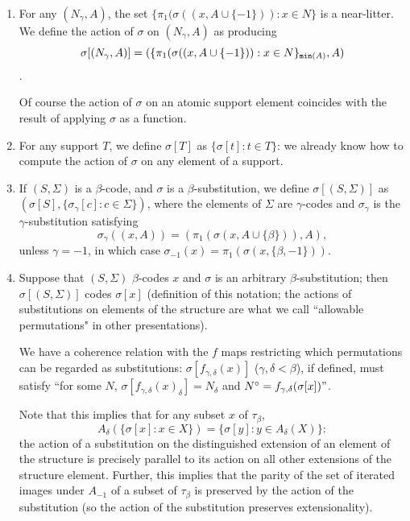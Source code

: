 \documentclass[12pt]{article}
\begin{document}
\begin{enumerate}
\begin{enumerate}
\item  For any $(N_\gamma,A)$, the set $\{\pi_1(\sigma((x,A\cup \{-1\})):x \in N\}$ is a near-litter.  We define the action of $\sigma$ on $(N_\gamma,A)$ as producing  $$\sigma[(N_\gamma,A)] = (\{\pi_1(\sigma((x,A\cup \{-1\})):x \in N\}_{{\tt min}(A)},A)$$.

Of course the action of $\sigma$ on an atomic support element coincides with the result of applying $\sigma$ as a function.

\item For any support $T$, we define $\sigma[T]$ as $\{\sigma[t]:t \in T\}$:  we already know how to compute the action of $\sigma$ on any element of a support.

\item  If $(S,\Sigma)$ is a $\beta$-code, and $\sigma$ is a $\beta$-substitution, we define $\sigma[(S,\Sigma)]$ as $(\sigma[S],\{\sigma_\gamma[c]:c \in \Sigma\})$, where the elements of $\Sigma$ are $\gamma$-codes and  $\sigma_{\gamma}$ is the $\gamma$-substitution satisfying $$\sigma_\gamma((x,A)) = (\pi_1(\sigma(x,A\cup \{\beta\})),A),$$ 
unless $\gamma=-1$, in which case $\sigma_{-1}(x) = \pi_1(\sigma(x,\{\beta,-1\}))$.

\item  Suppose that $(S,\Sigma)$ $\beta$-codes $x$ and $\sigma$ is an arbitrary $\beta$-substitution;  then $\sigma[(S,\Sigma)]$ codes $\sigma[x]$ (definition of this notation;  the actions of substitutions on elements of the structure are what we call ``allowable permutations" in other presentations).  

We have a coherence relation with the $f$ maps restricting which permutations can be regarded as substitutions:  $\sigma[f_{\gamma,\delta}(x)]$ ($\gamma,\delta<\beta$), if defined, must  satisfy ``for some $N$, 
$\sigma[f_{\gamma,\delta}(x)_\delta] = N_\delta$ and $N^\circ = f_{\gamma,\delta}(\sigma[x])"$.  

Note that this implies that for any subset $x$ of $\tau_\beta$,
$$A_\delta(\{\sigma[x]:x \in X\}) = \{\sigma[y]:y \in A_\delta(X)\}:$$  the action of a substitution on the distinguished extension of an element of the structure is precisely parallel to its action on all other extensions of the structure element.  Further, this implies that the parity of the set of iterated images under $A_{-1}$ of a subset of $\tau_\beta$ is preserved by the action of the substitution (so the action of the substitution preserves extensionality).

\end{enumerate}


\end{enumerate}
\end{document}
